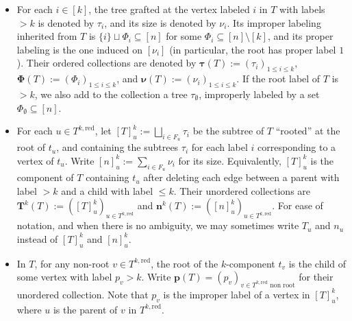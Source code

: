 \documentclass{article}
\theoremstyle{remark}
\newcommand{\bc}{\mathbf{c}}
\newcommand{\bj}{\mathbf{j}}
\newcommand{\bn}{\mathbf{n}}
\newcommand{\red}{\mathrm{red}}
\begin{document}
\begin{itemize}
    The unordered collections of the above objects are respectively denoted by $\mathbf{t}(T) := ( t_u )_{u\in T^{k,\red}}$, $\mathbf{F}(T) := ( F_u )_{u\in T^{k,\red}}$, $\bj(T) := ( j_u )_{u\in T^{k,\red}}$ and $\bc(T) := ( c_u )_{u\in T^{k,\red}}$.
    We allow $t_u = F_u = \emptyset$ and $j_u=0$ for the root vertex $u=\rho(T^{k,\red})$ of $T^{k,\red}$ if the root label of $T$ is $>k$.
    \item For each $i\in[k]$, the tree grafted at the vertex labeled $i$ in $T$ with labels $>k$ is denoted by $\tau_i$, and its size is denoted by $\nu_i$.
    Its improper labeling inherited from $T$ is $\{i\} \sqcup \Phi_i \subseteq [n]$ for some $\Phi_i \subseteq [n]\setminus[k]$, and its proper labeling is the one induced on $[\nu_i]$ (in particular, the root has proper label $1$).
    Their ordered collections are denoted by $\bm{\tau}(T) := ( \tau_i )_{1\le i\le k}$, $\mathbf{\Phi}(T) := ( \Phi_i )_{1\le i\le k}$, and $\bm{\nu}(T) := ( \nu_i )_{1\le i\le k}$.
    If the root label of $T$ is $>k$, we also add to the collection a tree $\tau_\emptyset$, improperly labeled by a set $\Phi_\emptyset \subseteq [n]$.
    \item For each $u\in T^{k,\red}$, let $[T]^{k}_u := \bigsqcup_{i\in F_u} \tau_i$ be the subtree of $T$ \enquote{rooted} at the root of $t_u$, and containing the subtrees $\tau_i$ for each label $i$ corresponding to a vertex of $t_u$.
    Write $[n]^{k}_u := \sum_{i\in F_u} \nu_i$ for its size.
    Equivalently, $[T]_u^k$ is the component of $T$ containing $t_u$ after deleting each edge between a parent with label $>k$ and a child with label $\le k$.
    Their unordered collections are $\mathbf{T}^{k}(T) := {\left( [T]^{k}_u \right)}_{u\in T^{k,\red}}$ and $\bn^{k}(T) := {\left( [n]^{k}_u \right)}_{u\in T^{k,\red}}$.
    For ease of notation, and when there is no ambiguity, we may sometimes write $T_u$ and $n_u$ instead of $[T]_u^k$ and $[n]_u^k$.
  \item  In $T$, for any non-root $v \in T^{k,\red}$, the root of the $k$-component $t_v$ is the child of some vertex with label $p_v > k$.
    Write $\mathbf{p}(T) = (p_v)_{v\in T^{k,\red} \text{ non root}}$ for their unordered collection. 
    Note that $p_v$ is the improper label of a vertex in $[T]_u^k$, where $u$ is the parent of $v$ in $T^{k,\red}$.
\end{itemize}
\end{document}
